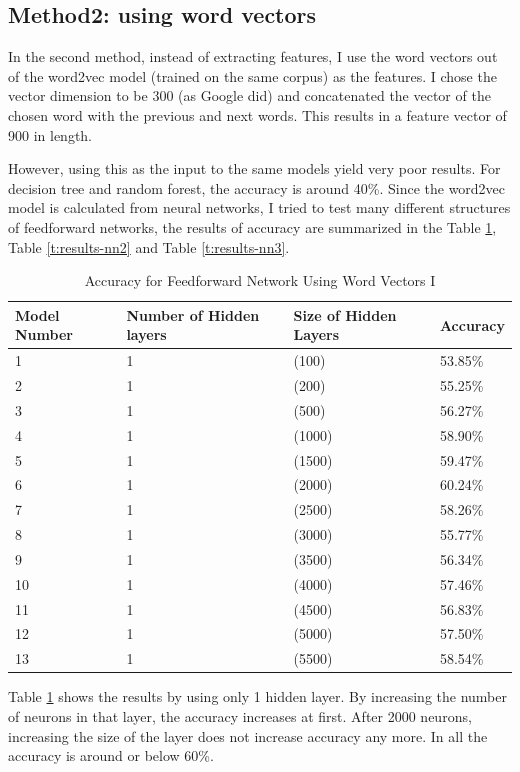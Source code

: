 \documentclass[11pt]{article}
\theoremstyle{plain}
\begin{document}
\subsection{Method2: using word vectors}
In the second method, instead of extracting features, I use the word vectors 
out of the word2vec model (trained on the same corpus) as the features. I 
chose the vector dimension to be 300 (as Google did) and concatenated the 
vector of the chosen word with the previous and next words. This results in 
a feature vector of 900 in length. 

However, using this as the input to the same models yield very poor results. 
For decision tree and random forest, the accuracy is around 40\%. Since the 
word2vec model is calculated from neural networks, I tried to test many 
different structures of feedforward networks, the results of accuracy are 
summarized in the Table \ref{t:results-nn1}, Table \ref{t:results-nn2} and 
Table \ref{t:results-nn3}.
\begin{table}[!ht]
	\centering
	\caption{Accuracy for Feedforward Network Using Word 
	Vectors I}\label{t:results-nn1}
	\begin{tabular}{llll}
		\hline \hline 
		Model Number & Number of Hidden layers & Size of Hidden Layers 
		&Accuracy\\
		\hline
		1 & 1 & (100) &   53.85\%   \\
		2 & 1 & (200) &   55.25\%   \\
		3 & 1 & (500) &   56.27\%   \\
		4 & 1 & (1000) &   58.90\%   \\
		5 & 1 & (1500) &   59.47\%   \\
		6 & 1 & (2000) &   60.24\%   \\
		7 & 1 & (2500) &   58.26\%   \\
		8 & 1 & (3000) &   55.77\%   \\
		9 & 1 & (3500) &   56.34\%   \\
		10 & 1 & (4000) &   57.46\%   \\
		11 & 1 & (4500) &   56.83\%   \\
		12 & 1 & (5000) &   57.50\%   \\
		13 & 1 & (5500) &   58.54\%   \\
		\hline \hline 
	\end{tabular}
\end{table}

Table \ref{t:results-nn1} shows the results by using only 1 hidden layer. By 
increasing the number of neurons in that layer, the accuracy increases at 
first. After 2000 neurons, increasing the size of the layer does not increase 
accuracy any more. In all the accuracy is around or below 60\%.
\end{document}
